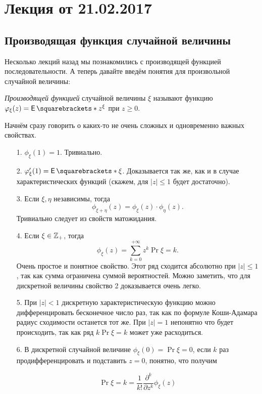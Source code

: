 \section{Лекция от 21.02.2017}

\subsection{Производящая функция случайной величины}

Несколько лекций назад мы познакомились с производящей функцией
последовательности. А теперь давайте введём понятия для произвольной случайной
величины:

\begin{definition}
  \textit{Производящей функцией} случайной величины $\xi$ называют
  функцию $\phi_{\xi}(z) = \E{z^{\xi}}$ при $z \geqslant 0$.
\end{definition}

Начнём сразу говорить о каких-то не очень сложных и одновременно важных
свойствах.

\begin{itemize}
  \item[1.] $\phi_{\xi}(1) = 1$. Тривиально.
  \item[2.] $\phi_{\xi}'(1) = \E{\xi}$. Доказывается так же, как и в случае характеристических функций (скажем, для $|z| \leq 1$ будет достаточно).
  \item[3.] Если $\xi, \eta$ независимы, тогда
  \[
    \phi_{\xi + \eta}(z) = \phi_{\xi}(z) \cdot \phi_{\eta}(z).
  \]
  Тривиально следует из свойств матожидания.
  \item[4.] Если $\xi \in \mathbb{Z}_+$, тогда 
  \[
    \phi_{\xi}(z) = \sum\limits_{k = 0}^{+\infty} z^k\Pr{\xi = k}.
  \]
  Очень простое и понятное свойство. Этот ряд сходится абсолютно при $|z| \leq 1$,
  так как сумма ограничена суммой вероятностей.
  Можно заметить, что для дискретной величины свойство 2 доказывается очень легко.

  \item[5.] При $|z| < 1$ дискретную характеристическую функцию
  можно дифференцировать
  бесконечное число раз, так как по формуле Коши-Адамара радиус
  сходимости останется тот же. При $|z| = 1$ непонятно что будет происходить, так
  как ряд $k\Pr{\xi = k}$ может уже расходиться.

  \item[6.] В дискретной случайной величине $\phi_{\xi}(0) = \Pr{\xi = 0}$, если
  $k$ раз продифференцировать и подставить $z = 0$, понятно, что получим

  \[
    \Pr{\xi = k} = \frac{1}{k!}\frac{\partial^k}{\partial z^k}\phi_{\xi}(z)
  \]
\end{itemize}

